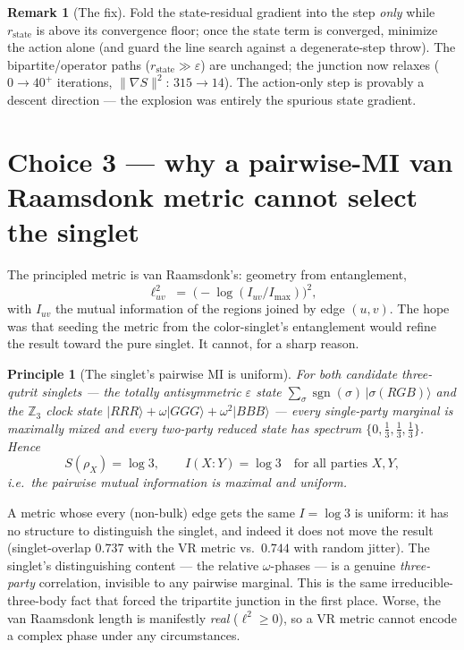 \documentclass[11pt]{article}
\newtheorem{principle}{Principle}
\theoremstyle{definition}
\newtheorem{remark}{Remark}
\newcommand{\Z}{\mathbb{Z}}
\newcommand{\lsq}{\ell^2}
\begin{document}
\begin{remark}[The fix]
Fold the state-residual gradient into the step \emph{only} while
$r_{\text{state}}$ is above its convergence floor; once the state term is
converged, minimize the action alone (and guard the line search against a
degenerate-step throw). The bipartite/operator paths
($r_{\text{state}}\gg\varepsilon$) are unchanged; the junction now relaxes
($0\to 40^+$ iterations, $\lVert\nabla S\rVert^2:\,315\to 14$). The action-only
step is provably a descent direction --- the explosion was entirely the spurious
state gradient.
\end{remark}

\section{Choice 3 --- why a pairwise-MI van Raamsdonk metric cannot select the singlet}

The principled metric is van Raamsdonk's: geometry from entanglement,
\[
  \lsq_{uv} \;=\; \big(-\log(I_{uv}/I_{\max})\big)^2 ,
\]
with $I_{uv}$ the mutual information of the regions joined by edge $(u,v)$. The
hope was that seeding the metric from the color-singlet's entanglement would
refine the result toward the pure singlet. It cannot, for a sharp reason.

\begin{principle}[The singlet's pairwise MI is uniform]
For \emph{both} candidate three-qutrit singlets --- the totally antisymmetric
$\varepsilon$ state $\sum_{\sigma}\operatorname{sgn}(\sigma)\,|\sigma(RGB)\rangle$
and the $\Z_3$ clock state $|RRR\rangle+\omega|GGG\rangle+\omega^2|BBB\rangle$ ---
every single-party marginal is maximally mixed and every two-party reduced state
has spectrum $\{0,\tfrac13,\tfrac13,\tfrac13\}$. Hence
\[
  S(\rho_X)=\log 3,\qquad
  I(X{:}Y)=\log 3\quad\text{for all parties }X,Y,
\]
i.e.\ the pairwise mutual information is \emph{maximal and uniform}.
\end{principle}

A metric whose every (non-bulk) edge gets the same $I=\log 3$ is uniform: it has
no structure to distinguish the singlet, and indeed it does not move the result
(singlet-overlap $0.737$ with the VR metric vs.\ $0.744$ with random jitter). The
singlet's distinguishing content --- the relative $\omega$-phases --- is a
genuine \emph{three-party} correlation, invisible to any pairwise marginal. This
is the same irreducible-three-body fact that forced the tripartite junction in the
first place. Worse, the van Raamsdonk length is manifestly \emph{real}
($\lsq\ge 0$), so a VR metric cannot encode a complex phase under any
circumstances.
\end{document}
